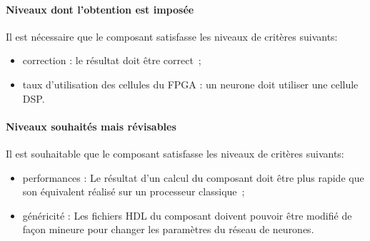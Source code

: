 \paragraph{Niveaux dont l’obtention est imposée\\}

Il est nécessaire que le composant satisfasse les niveaux de critères suivants:
\begin{itemize}
	\item correction : le résultat doit être correct~;
	\item taux d'utilisation des cellules du FPGA : un neurone doit utiliser
		une cellule DSP.
\end{itemize}

\paragraph{Niveaux souhaités mais révisables\\}

Il est souhaitable que le composant satisfasse les niveaux de critères suivants:
\begin{itemize}
	\item performances : Le résultat d'un calcul du composant doit être plus
		rapide que son équivalent réalisé sur un processeur classique~;
	\item généricité : Les fichiers HDL du composant doivent pouvoir être
		modifié de façon mineure pour changer les paramètres du réseau
		de neurones.
\end{itemize}


